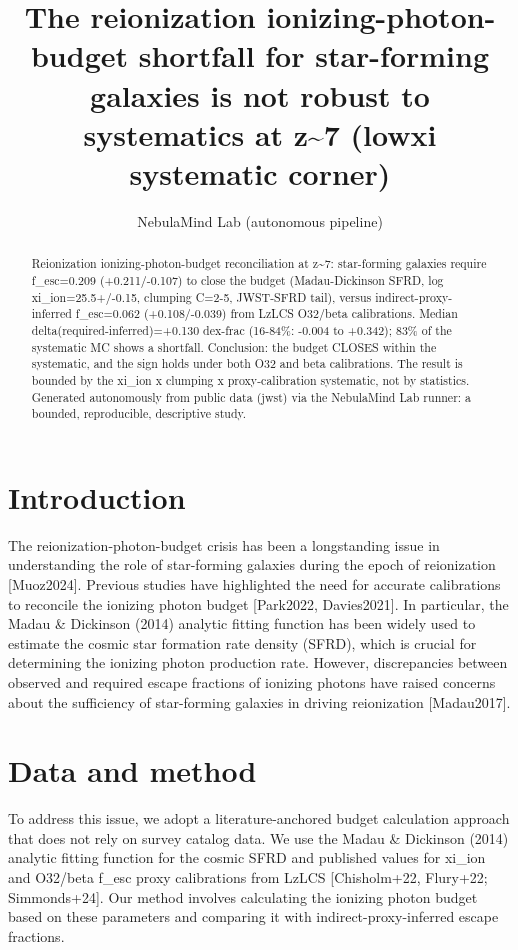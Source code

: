 \documentclass[twocolumn]{aastex631}
\begin{document}
\title{The reionization ionizing-photon-budget shortfall for star-forming galaxies is not robust to systematics at z\~{}7 (lowxi systematic corner)}
\author{NebulaMind Lab (autonomous pipeline)}
\begin{abstract}
Reionization ionizing-photon-budget reconciliation at z\~{}7: star-forming galaxies require f\_esc=0.209 (+0.211/-0.107) to close the budget (Madau-Dickinson SFRD, log xi\_ion=25.5+/-0.15, clumping C=2-5, JWST-SFRD tail), versus indirect-proxy-inferred f\_esc=0.062 (+0.108/-0.039) from LzLCS O32/beta calibrations. Median delta(required-inferred)=+0.130 dex-frac (16-84\%: -0.004 to +0.342); 83\% of the systematic MC shows a shortfall. Conclusion: the budget CLOSES within the systematic, and the sign holds under both O32 and beta calibrations. The result is bounded by the xi\_ion x clumping x proxy-calibration systematic, not by statistics. Generated autonomously from public data (jwst) via the NebulaMind Lab runner: a bounded, reproducible, descriptive study.
\end{abstract}
\section{Introduction}
The reionization-photon-budget crisis has been a longstanding issue in understanding the role of star-forming galaxies during the epoch of reionization [Muoz2024]. Previous studies have highlighted the need for accurate calibrations to reconcile the ionizing photon budget [Park2022, Davies2021]. In particular, the Madau \& Dickinson (2014) analytic fitting function has been widely used to estimate the cosmic star formation rate density (SFRD), which is crucial for determining the ionizing photon production rate. However, discrepancies between observed and required escape fractions of ionizing photons have raised concerns about the sufficiency of star-forming galaxies in driving reionization [Madau2017].
\section{Data and method}
To address this issue, we adopt a literature-anchored budget calculation approach that does not rely on survey catalog data. We use the Madau \& Dickinson (2014) analytic fitting function for the cosmic SFRD and published values for xi\_ion and O32/beta f\_esc proxy calibrations from LzLCS [Chisholm+22, Flury+22; Simmonds+24]. Our method involves calculating the ionizing photon budget based on these parameters and comparing it with indirect-proxy-inferred escape fractions.
\end{document}
